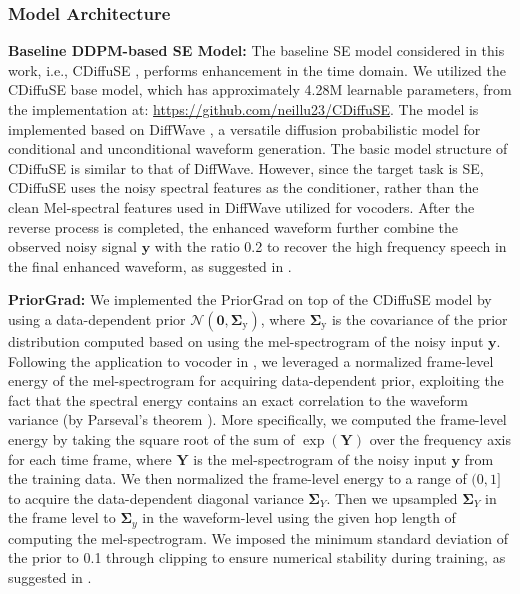 \subsubsection{Model Architecture}
\noindent\textbf{Baseline DDPM-based SE Model:} The baseline SE model considered in this work, i.e., CDiffuSE \citep{lu2022conditional}, performs enhancement in the time domain. We utilized the CDiffuSE base model, which has approximately 4.28M learnable parameters, from the implementation at: \url{https://github.com/neillu23/CDiffuSE}. The model is implemented based on DiffWave \citep{kong2020diffwave}, a versatile diffusion probabilistic model for conditional and unconditional waveform generation. The basic model structure of CDiffuSE is similar to that of DiffWave. However, since the target task is SE, CDiffuSE uses the noisy spectral features as the conditioner, rather than the clean Mel-spectral features used in DiffWave utilized for vocoders. After the reverse process is completed, the enhanced waveform further combine the observed noisy signal $\mathbf{y}$ with the ratio 0.2 to recover the high frequency speech in the final enhanced waveform, as suggested in \citet{abd2008speech,defossez2020real}. 

\noindent\textbf{PriorGrad:} We implemented the PriorGrad \citep{lee2021priorgrad} on top of the CDiffuSE model by using a data-dependent prior $\mathcal{N}(\mathbf{0},\boldsymbol{\Sigma}_{\text{y}})$, where $\boldsymbol{\Sigma}_{\text{y}}$ is the covariance of the prior distribution computed based on using the mel-spectrogram of the noisy input $\mathbf{y}$. Following the application to vocoder in \citet{lee2021priorgrad}, we leveraged a normalized frame-level energy of the mel-spectrogram for acquiring data-dependent prior, exploiting the fact that the spectral energy contains an exact correlation to the waveform variance (by Parseval’s theorem \citep{stoica2005spectral}). More specifically, we computed the frame-level energy by taking the square root of the sum of $\exp(\mathbf{Y})$ over the frequency axis for each time frame, where $\mathbf{Y}$ is the mel-spectrogram of the noisy input $\mathbf{y}$ from the training data. We then normalized the frame-level energy to a range of $(0, 1]$ to acquire the data-dependent diagonal variance $\boldsymbol{\Sigma}_{Y}$. Then we upsampled $\boldsymbol{\Sigma}_{Y}$ in the frame level to $\boldsymbol{\Sigma}_{y}$ in the waveform-level using the given hop length of computing the mel-spectrogram. We imposed the minimum standard deviation of the prior to 0.1 through clipping to ensure numerical stability during training, as suggested in \citet{lee2021priorgrad}.

